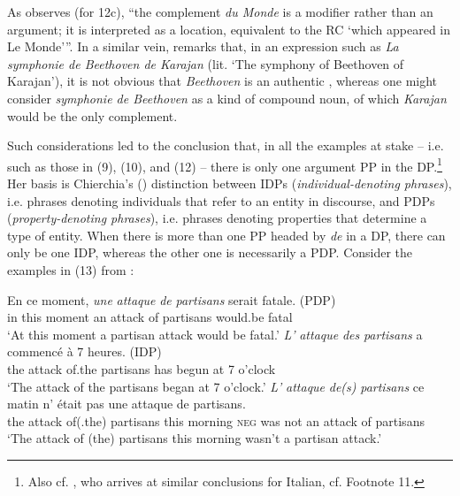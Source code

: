 \documentclass[output=paper]{langsci/langscibook}
\begin{document}
As \citet[268, Footnote 31]{Godard1992} observes (for 12c), “the complement \textit{du Monde} is a modifier rather than an argument; it is interpreted as a location, equivalent to the RC ‘which appeared in Le Monde’”. In a similar vein, \citet[86–87, Footnote 2]{Milner1982} remarks that, in an expression such as \textit{La symphonie de Beethoven de Karajan} (lit. ‘The symphony of Beethoven of Karajan’), it is not obvious that \textit{Beethoven} is an authentic \AGENT, whereas one might consider \textit{symphonie de Beethoven} as a kind of compound noun, of which \textit{Karajan} would be the only complement.

Such considerations led \citet{Kolliakou1999} to the conclusion that, in all the examples at stake – i.e. such as those in (9), (10), and (12) – there is only one argument PP in the DP.\footnote{Also cf. \citet[93]{Cinque2014}, who arrives at similar conclusions for Italian, cf. Footnote 11.} Her basis is Chierchia's (\citeyear{Chierchia1982,Chierchia1985}) distinction between IDPs (\textit{individual-denoting phrases}), i.e. phrases denoting individuals that refer to an entity in discourse, and PDPs (\textit{property-denoting phrases}), i.e. phrases denoting properties that determine a type of entity. When there is more than one PP headed by \textit{de} in a DP, there can only be one IDP, whereas the other one is necessarily a PDP. Consider the examples in (13) from \citet[736]{Kolliakou1999}:

\ea%
    \label{ex:mensch:13}
    \ea
    \gll En ce moment,  \textit{une}  \textit{attaque}  \textit{de}  \textit{partisans}  serait  fatale. (PDP)\\
         in this  moment  an  attack  of  partisans  would.be  fatal\\
    \glt ‘At this moment a partisan attack would be fatal.’
    \ex  
    \gll \textit{L’} \textit{attaque}  \textit{des}  \textit{partisans}  a  commencé  à {7 heures}. (IDP)\\
         the attack  of.the  partisans  has  begun    at {7 o’clock}\\
    \glt ‘The attack of the partisans began at 7 o’clock.’
    \ex  
    \gll \textit{L’}  \textit{attaque}  \textit{de(s)}   \textit{partisans}  ce  matin    n’ était    pas       une  attaque  de  partisans.\\
         the  attack    of(.the) partisans  this  morning  \textsc{neg} was  not    an  attack    of  partisans\\
    \glt ‘The attack of (the) partisans this morning wasn’t a partisan attack.’
    \z
\z
\end{document}

